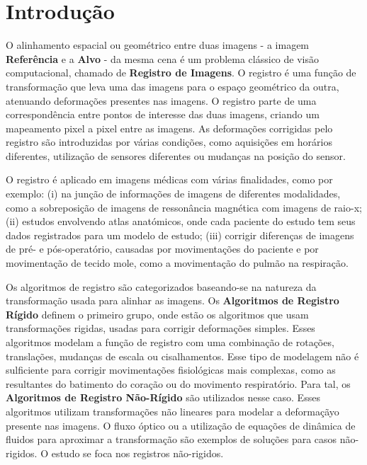 \chapter{Introdução}
\label{cap:introducao}

  O alinhamento espacial ou geométrico entre duas imagens - a imagem
\textbf{Referência} e a \textbf{Alvo} - da mesma cena é um problema clássico de
visão computacional, chamado de \textbf{Registro de Imagens}. O registro é uma
função de transformação que leva uma das imagens para o espaço geométrico da
outra, atenuando deformações presentes nas imagens. O registro parte de uma
correspondência entre pontos de interesse das duas imagens, criando um
mapeamento pixel a pixel entre as imagens. As deformações corrigidas pelo
registro são introduzidas por várias condições, como aquisições em horários
diferentes, utilização de sensores diferentes ou mudanças na posição do sensor.

  O registro é aplicado em imagens médicas com várias finalidades, como por
exemplo: (i) na junção de informações de imagens de diferentes modalidades,
como a sobreposição de imagens de ressonância magnética com imagens de raio-x;
(ii) estudos envolvendo atlas anatómicos, onde cada paciente do estudo tem seus
dados registrados para um modelo de estudo; (iii) corrigir diferenças de
imagens de pré- e pós-operatório, causadas por movimentações do paciente e por
movimentação de tecido mole, como a movimentação do pulmão na respiração.

  Os algoritmos de registro são categorizados baseando-se na natureza da
transformação usada para alinhar as imagens. Os \textbf{Algoritmos de Registro
Rígido} definem o primeiro grupo, onde estão os algoritmos que usam
transformações rigidas, usadas para corrigir deformações simples. Esses
algoritmos modelam a função de registro com uma combinação de rotações,
translações, mudanças de escala ou cisalhamentos. Esse tipo de modelagem não
é sulficiente para corrigir movimentações fisiológicas mais complexas, como
as resultantes do batimento do coração ou do movimento respiratório. Para tal,
os \textbf{Algoritmos de Registro Não-Rígido} são utilizados nesse caso. Esses
algoritmos utilizam transformações não lineares para modelar a deformaçãyo
presente nas imagens. O fluxo óptico ou a utilização de equações de dinâmica de
fluidos para aproximar a transformação são exemplos de soluções para casos
não-rigidos. O estudo se foca nos registros não-rigidos.

